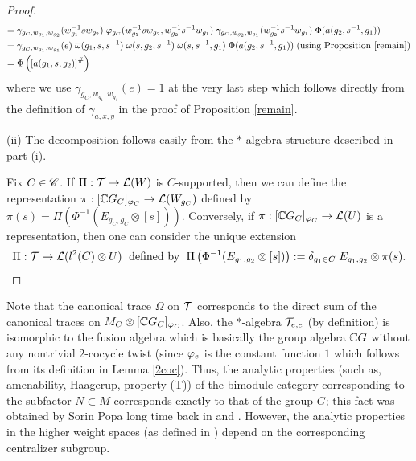 \begin{proof}
\begin{align*}
= & \; \gamma_{g_C, w_{g_1} , w_{g_2} } (w^{-1}_{g_1} s w_{g_2}) \; \varphi_{g_C} ( w^{-1}_{g_1} s w_{g_2} , w^{-1}_{g_2} s^{-1} w_{g_1} ) \; \gamma_{g_C , w_{g_2} , w_{g_1} } ( w^{-1}_{g_2} s^{-1} w_{g_1}) \; \Phi (a(g_2,s^{-1},g_1))\\
= & \; \gamma_{g_C , w_{g_1} , w_{g_1} } (e) \; \overline{\omega} (g_1 , s , s^{-1}) \; \omega (s , g_2 , s^{-1}) \; \overline{\omega} (s , s^{-1} , g_1) \; \Phi (a(g_2 , s^{-1} , g_1)) \; \text{(using Proposition \ref{remain})}\\
=& \; \Phi \left( \left[  a(g_1,s,g_2)  \right]^\# \right)
\end{align*}
where we use $ \gamma_{g_C , w_{g_1} , w_{g_1} } (e) =1$ at the very last step which follows directly from the definition of $ \gamma_{a,x,y} $ in the proof of Proposition \ref{remain}.

(ii) The decomposition follows easily from the $ * $-algebra structure described in part (i).

Fix $ C\in \mathscr C $. If $ \Pi: \mathcal T \rightarrow \mathcal L (W) $ is $ C $-supported, then we can define the representation $ \pi : [\mathbb{C} G_C]_{\varphi_C} \rightarrow \mathcal L (W_{g_C}) $ defined by $ \pi (s) = \Pi\left(\Phi^{-1} (E_{g_C , g_C} \otimes [s])\right) $.
Conversely, if $ \pi : [\mathbb{C} G_C]_{\varphi_C} \rightarrow \mathcal L (U) $ is a representation, then one can consider the unique extension 
\[
\Pi : \mathcal T \rightarrow \mathcal L (l^2 (C) \otimes U) \; \text{ defined by } \; \Pi \left( \Phi^{-1} (E_{g_1 , g_2} \otimes [s] ) \right) := \delta_{g_1 \in C} \; E_{g_1,g_2} \otimes \pi (s) .
\]
\end{proof}
\begin{rem}
Note that the canonical trace $ \Omega $ on $ \mathcal T $ corresponds to the direct sum of the canonical traces on $ M_C \otimes [ \mathbb{C} G_C]_{\varphi_C} $.
Also, the $ * $-algebra $ \mathcal T_{e,e} $ (by definition) is isomorphic to the fusion algebra which is basically the group algebra $\mathbb{C} G $ without any nontrivial $ 2 $-cocycle twist (since $ \varphi_{e}$ is the constant function $1$ which follows from its definition in Lemma \ref{2coc}).
Thus, the analytic properties (such as, amenability, Haagerup, property (T)) of the bimodule category corresponding to the subfactor $ N \subset M $ corresponds exactly to that of the group $ G $; this fact was obtained by Sorin Popa long time back in \cite{frenchpop} and \cite{Pop94}.
However, the analytic properties in the higher weight spaces (as defined in \cite{GJ}) depend on the corresponding centralizer subgroup.
\end{rem}
